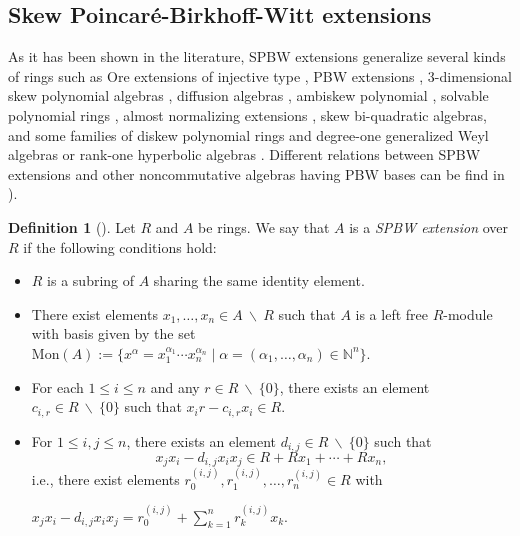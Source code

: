 \documentclass{amsart}
\theoremstyle{definition}
\newtheorem{definition}[theorem]{Definition}
\theoremstyle{remark}
\numberwithin{equation}{section}
\begin{document}
\subsection{Skew Poincar\'e-Birkhoff-Witt extensions}\label{SPBWdefinitionspreliminaries}

As it has been shown in the literature, SPBW extensions generalize several kinds of rings such as Ore extensions of injective type \cite{Ore1931, Ore1933}, PBW extensions \cite{BellGoodearl1988}, 3-dimensional skew polynomial algebras \cite{BellSmith1990}, diffusion algebras \cite{IsaevPyatovRittenberg2001, PyatovTwarock2002}, ambiskew polynomial \cite{Jordan2000}, solvable polynomial rings \cite{KandryWeispfenning1990}, almost normalizing extensions \cite{McConnellRobson2001}, skew bi-quadratic algebras, and some families of diskew polynomial rings and degree-one generalized Weyl algebras \cite{Bavula2020} or rank-one hyperbolic algebras \cite{Rosenberg1995}. Different relations between SPBW extensions and other noncommutative algebras having PBW bases can be find in \cite{BuesoTorrecillasVerschoren2003, GomezTorrecillas2014, Levandovskyy2005, Li2002, SeilerBook2010}). 

\begin{definition}[{\cite[Definition 1]{GallegoLezama2011}}]\label{defpbwextension} 
Let $R$ and $A$ be rings. We say that $A$ is a {\it SPBW extension} over $R$ if the following conditions hold:
\begin{itemize}
\item [(i)] $R$ is a subring of $A$ sharing the same identity element.

\item [(ii)] There exist elements $x_1, \ldots, x_n \in A\ \backslash\ R$ such that $A$ is a left free $R$-module with basis given by the set $\text{Mon}(A):= \{ x^{\alpha} = x_{1}^{\alpha_1} \cdots x_{n}^{\alpha_n}\mid \alpha =(\alpha_1, \ldots, \alpha_n) \in \mathbb{N}^n\}$.

\item[(iii)] For each $1 \leq i \leq n$ and any $r \in R\  \backslash\ \{0\}$, there exists an element $c_{i,r} \in R \ \backslash\ \{0\}$ such that $x_ir - c_{i,r}x_i \in R$.

\item[\rm (iv)]For $1\leq i, j\leq n$, there exists an element $d_{i,j}\in R\ \backslash\ \{0\}$ such that
\[
x_jx_i-d_{i,j}x_ix_j\in R+Rx_1+\cdots +Rx_n,
\]
i.e., there exist elements $r_0^{(i,j)}, r_1^{(i,j)}, \dotsc, r_n^{(i,j)} \in R$ with
\begin{center}\label{relSPBW}
$x_jx_i - d_{i,j}x_ix_j = r_0^{(i,j)} + \sum_{k=1}^{n} r_k^{(i,j)}x_k$.    
\end{center}
\end{itemize}
\end{definition}
\end{document}

